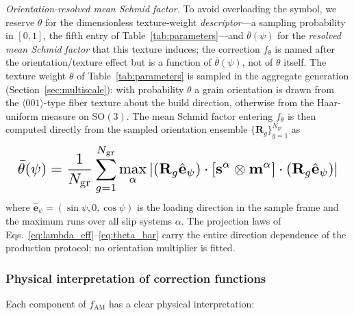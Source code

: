 \documentclass[12pt,a4paper,twocolumn]{article}
\begin{document}
\emph{Orientation-resolved mean Schmid factor.} To avoid overloading the symbol, we reserve $\theta$ for the dimensionless texture-weight \emph{descriptor}---a sampling probability in $[0,1]$, the fifth entry of Table~\ref{tab:parameters}---and $\bar{\theta}(\psi)$ for the \emph{resolved mean Schmid factor} that this texture induces; the correction $f_\theta$ is named after the orientation/texture effect but is a function of $\bar{\theta}(\psi)$, not of $\theta$ itself. The texture weight $\theta$ of Table~\ref{tab:parameters} is sampled in the aggregate generation (Section~\ref{sec:multiscale}): with probability $\theta$ a grain orientation is drawn from the $\langle001\rangle$-type fiber texture about the build direction, otherwise from the Haar-uniform measure on $\mathrm{SO}(3)$. The mean Schmid factor entering $f_\theta$ is then computed directly from the sampled orientation ensemble $\{\mathbf{R}_g\}_{g=1}^{N_{\mathrm{gr}}}$ as
\begin{equation}
\resizebox{0.97\columnwidth}{!}{$\displaystyle \bar{\theta}(\psi) = \frac{1}{N_{\mathrm{gr}}} \sum_{g=1}^{N_{\mathrm{gr}}} \max_{\alpha} \left| \left(\mathbf{R}_g \hat{\mathbf{e}}_\psi\right) \cdot \left[ \mathbf{s}^\alpha \otimes \mathbf{m}^\alpha \right] \cdot \left(\mathbf{R}_g \hat{\mathbf{e}}_\psi\right) \right|$}
\label{eq:theta_bar}
\end{equation}
where $\hat{\mathbf{e}}_\psi = (\sin\psi, 0, \cos\psi)$ is the loading direction in the sample frame and the maximum runs over all slip systems $\alpha$. The projection laws of Eqs.~\eqref{eq:lambda_eff}--\eqref{eq:theta_bar} carry the entire direction dependence of the production protocol; no orientation multiplier is fitted.

\subsubsection{Physical interpretation of correction functions}

Each component of $f_{\text{AM}}$ has a clear physical interpretation:
\end{document}
